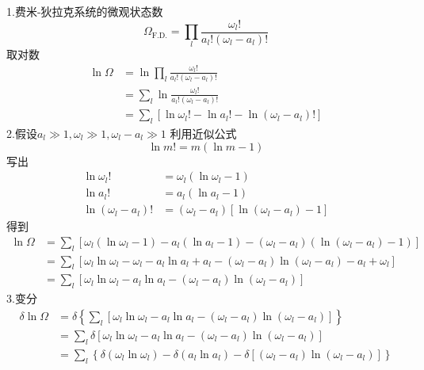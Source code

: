 1.费米-狄拉克系统的微观状态数
\begin{equation}
    \Omega _{\mathrm{F}.\mathrm{D}.}=\prod_l{\frac{\omega _l!}{a_l!\left( \omega _l-a_l \right) !}}
\end{equation}
取对数
\begin{equation}
    \begin{aligned}
        \ln \Omega &=\ln \prod_l{\frac{\omega _l!}{a_l!\left( \omega _l-a_l \right) !}}
\\
&=\sum_l{\ln \frac{\omega _l!}{a_l!\left( \omega _l-a_l \right) !}}
\\
&=\sum_l{\left[ \ln \omega _l!-\ln a_l!-\ln \left( \omega _l-a_l \right) ! \right]}
    \end{aligned}
\end{equation}
2.假设$a_l\gg 1,\omega _l\gg 1,\omega _l-a_l\gg 1$
利用近似公式
\begin{equation}
    \ln m!=m\left( \ln m-1 \right) 
\end{equation}
写出
\begin{equation}
    \begin{aligned}
        \ln \omega _l!&=\omega _l\left( \ln \omega _l-1 \right) 
\\
\ln a_l!&=a_l\left( \ln a_l-1 \right) 
\\
\ln \left( \omega _l-a_l \right) !&=\left( \omega _l-a_l \right) \left[ \ln \left( \omega _l-a_l \right) -1 \right] 
    \end{aligned}
\end{equation}
得到
\begin{equation}
    \begin{aligned}
        \ln \Omega &=\sum_l{\left[ \omega _l\left( \ln \omega _l-1 \right) -a_l\left( \ln a_l-1 \right) -\left( \omega _l-a_l \right) \left( \ln \left( \omega _l-a_l \right) -1 \right) \right]}
\\
&=\sum_l{\left[ \omega _l\ln \omega _l-\omega _l-a_l\ln a_l+a_l-\left( \omega _l-a_l \right) \ln \left( \omega _l-a_l \right) -a_l+\omega _l \right]}
\\
&=\sum_l{\left[ \omega _l\ln \omega _l-a_l\ln a_l-\left( \omega _l-a_l \right) \ln \left( \omega _l-a_l \right) \right]}
    \end{aligned}
\end{equation}
3.变分
\begin{equation}
    \begin{aligned}
        \delta \ln \Omega &=\delta \left\{ \sum_l{\left[ \omega _l\ln \omega _l-a_l\ln a_l-\left( \omega _l-a_l \right) \ln \left( \omega _l-a_l \right) \right]} \right\} 
\\
&=\sum_l{\delta \left[ \omega _l\ln \omega _l-a_l\ln a_l-\left( \omega _l-a_l \right) \ln \left( \omega _l-a_l \right) \right]}
\\
&=\sum_l{\left\{ \delta \left( \omega _l\ln \omega _l \right) -\delta \left( a_l\ln a_l \right) -\delta \left[ \left( \omega _l-a_l \right) \ln \left( \omega _l-a_l \right) \right] \right\}}
    \end{aligned}
\end{equation}
